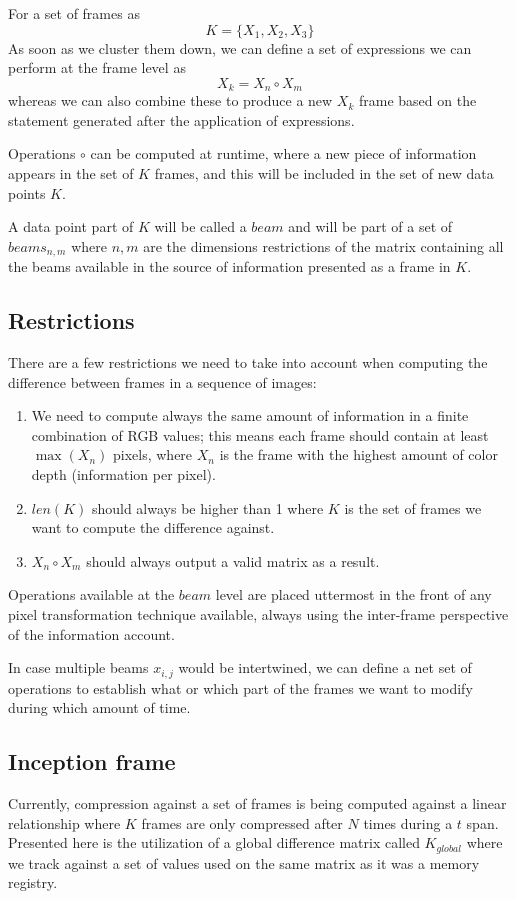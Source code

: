 \documentclass[twocolumn]{article}
\begin{document}
For a set of frames as
$$
K = \{X_1,X_2,X_3\}
$$
As soon as we cluster them down, we can define a set of expressions we can perform at the frame level as  $$X_{k} = X_{n} \circ X_{m}$$ whereas we can also combine these to produce a new $X_{k}$ frame based on the statement generated after the application of expressions.

Operations $\circ$ can be computed at runtime, where a new piece of information appears in the set of $K$ frames, and this will be included in the set of new data points $K$. 

A data point part of $K$ will be called a $beam$ and will be part of a set of $beams_{n,m}$ where $n,m$ are the dimensions restrictions of the matrix containing all the beams available in the source of information presented as a frame in $K$.

\subsection{Restrictions}
There are a few restrictions we need to take into account when computing the difference between frames in a sequence of images:

\begin{enumerate}
    \item We need to compute always the same amount of information in a finite combination of RGB values; this means each frame should contain at least $\max(X_n)$ pixels, where $X_n$ is the frame with the highest amount of color depth (information per pixel).
    \item ${len}(K)$ should always be higher than 1 where $K$ is the set of frames we want to compute the difference against.
    \item $X_{n} \circ X_{m}$ should always output a valid matrix as a result.
\end{enumerate}

Operations available at the $beam$ level are placed uttermost in the front of any pixel transformation technique available, always using the inter-frame perspective of the information account.

In case multiple beams $x_{i,j}$ would be intertwined, we can define a net set of operations to establish what or which part of the frames we want to modify during which amount of time.

\subsection{Inception frame}
Currently, compression against a set of frames is being computed against a linear relationship where $K$ frames are only compressed after $N$ times during a $t$ span. Presented here is the utilization of a global difference matrix called $K_{global}$ where we track against a set of values used on the same matrix as it was a memory registry.
\end{document}
